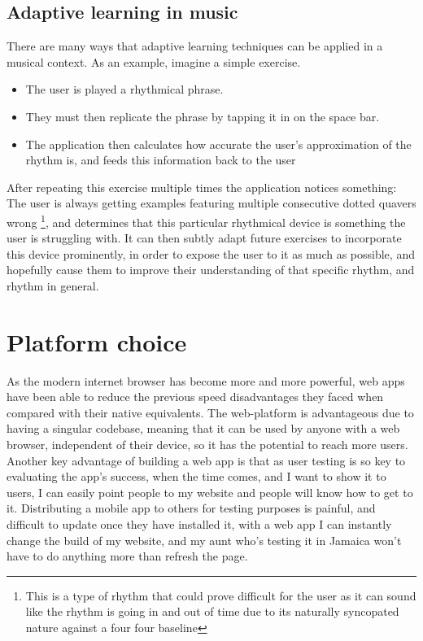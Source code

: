 	
	\subsection{Adaptive learning in music}
		There are many ways that adaptive learning techniques can be applied in a musical context. As an example, imagine a simple exercise.
		\begin{itemize}
			\item The user is played a rhythmical phrase.
			\item They must then replicate the phrase by tapping it in on the space bar. 
			\item The application then calculates how accurate the user's approximation of the rhythm is, and feeds this information back to the user
		\end{itemize}
		After repeating this exercise multiple times the application notices something: The user is always getting examples featuring multiple consecutive dotted quavers wrong		\footnote{This is a type of rhythm that could prove difficult for the user as it can sound like the rhythm is going in and out of time due to its naturally syncopated nature 		against a four four baseline}, and determines that this particular rhythmical device is something the user is struggling with. It can then subtly adapt future exercises to 	incorporate this device prominently, in order to expose the user to it as much as possible, and hopefully cause them to improve their understanding of that specific rhythm, and rhythm in general.
	\section{Platform choice}
	As the modern internet browser has become more and more powerful, web apps have been able to reduce the previous speed disadvantages they faced when compared with their native equivalents. The web-platform is advantageous due to having a singular codebase, meaning that it can be used by anyone with a web browser, independent of their device, so it has the potential to reach more users. Another key advantage of building a web app is that as user testing is so key to evaluating the app's success, when the time comes, and I want to show it to users, I can easily point people to my website and people will know how to get to it. Distributing a mobile app to others for testing purposes is painful, and difficult to update once they have installed it, with a web app I can instantly change the build of my website, and my aunt who's testing it in Jamaica won't have to do anything more than refresh the page.
